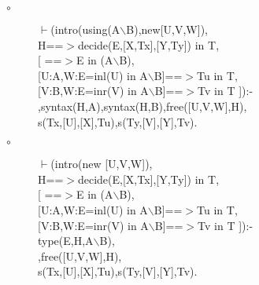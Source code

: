 \documentclass[11pt]{report}
\begin{document}
\begin{enumerate}
 \begin{description}
 \item[$\circ$]
\begin{sf}\begin{tabbing}
$\vdash$(intro(using(A$\backslash$B),new[U,V,W]),\\[-0.15ex]
\hspace{2em}H==$>$decide(E,[X,Tx],[Y,Ty]) in T,\\[-0.15ex]
\hspace{2em}[ ==$>$E in (A$\backslash$B), \\[-0.15ex]
\hspace{3em}[U:A,W:E=inl(U) in A$\backslash$B]==$>$Tu in T, \\[-0.15ex]
\hspace{3em}[V:B,W:E=inr(V) in A$\backslash$B]==$>$Tv in T ]):-\\[-0.15ex]
\hspace{2em}{\bf derived},syntax(H,A),syntax(H,B),free([U,V,W],H),\\[-0.15ex]
\hspace{2em}s(Tx,[U],[X],Tu),s(Ty,[V],[Y],Tv).
\end{tabbing}\end{sf}

 \item[$\circ$]
\begin{sf}\begin{tabbing}
$\vdash$(intro(new [U,V,W]),\\[-0.15ex]
\hspace{2em}H==$>$decide(E,[X,Tx],[Y,Ty]) in T, \\[-0.15ex]
\hspace{2em}[ ==$>$E in (A$\backslash$B),\\[-0.15ex]
\hspace{3em}[U:A,W:E=inl(U) in A$\backslash$B]==$>$Tu in T, \\[-0.15ex]
\hspace{3em}[V:B,W:E=inr(V) in A$\backslash$B]==$>$Tv in T ]):-\\[-0.15ex]
\hspace{2em}type(E,H,A$\backslash$B), \\[-0.15ex]
\hspace{2em}{\bf derived},free([U,V,W],H),\\[-0.15ex]
\hspace{2em}s(Tx,[U],[X],Tu),s(Ty,[V],[Y],Tv).
\end{tabbing}\end{sf}

 \end{description}
 \end{enumerate}
  
\end{document}
